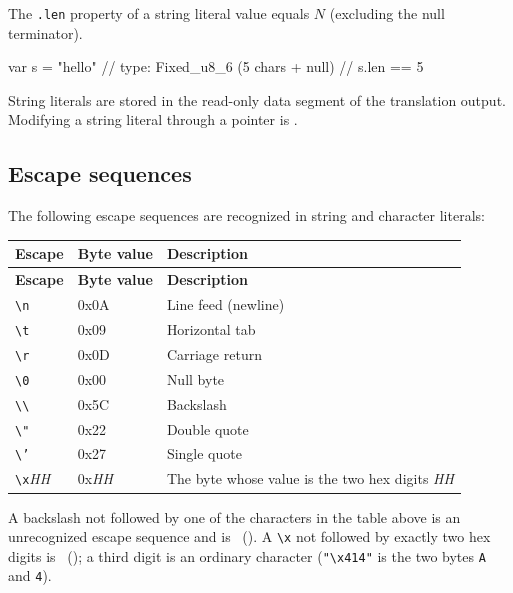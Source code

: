\pnum
The \texttt{.len} property of a string literal value equals $N$ (excluding
the null terminator).

\begin{example}
\begin{laincode}
var s = "hello"   // type: Fixed_u8_6 (5 chars + null)
                  // s.len == 5
\end{laincode}
\end{example}

\pnum
String literals are stored in the read-only data segment of the translation
output.  Modifying a string literal through a pointer is .

\subsection{Escape sequences}
\label{sec:lex.escape}

\pnum
The following escape sequences are recognized in string and character
literals:

\begin{longtable}{@{}lll@{}}
\toprule
\textbf{Escape} & \textbf{Byte value} & \textbf{Description} \\
\midrule
\endfirsthead
\toprule
\textbf{Escape} & \textbf{Byte value} & \textbf{Description} \\
\midrule
\endhead
\bottomrule
\endlastfoot
\texttt{\textbackslash n}  & 0x0A & Line feed (newline) \\
\texttt{\textbackslash t}  & 0x09 & Horizontal tab \\
\texttt{\textbackslash r}  & 0x0D & Carriage return \\
\texttt{\textbackslash 0}  & 0x00 & Null byte \\
\texttt{\textbackslash\textbackslash} & 0x5C & Backslash \\
\texttt{\textbackslash "} & 0x22 & Double quote \\
\texttt{\textbackslash '} & 0x27 & Single quote \\
\texttt{\textbackslash x}\textit{HH} & 0x\textit{HH} & The byte whose value is the two hex digits \textit{HH} \\
\end{longtable}

\begin{constraint}
  A backslash not followed by one of the characters in the table above is
  an unrecognized escape sequence and is \illformed{}~().
  A \texttt{\textbackslash x} not followed by exactly two hex digits is
  \illformed{}~(); a third digit is an ordinary character
  (\texttt{"\textbackslash x414"} is the two bytes \texttt{A} and \texttt{4}).
\end{constraint}

